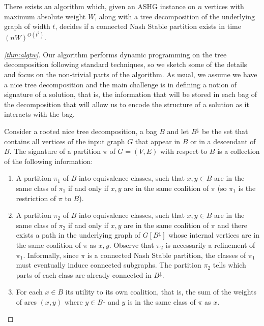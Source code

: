 \documentclass[letterpaper,USenglish,cleveref, autoref, thm-restate]{lipics-v2021}
\begin{document}
\begin{theorem}\label{thm:algtw}There exists an algorithm which, given an ASHG instance on $n$
vertices with maximum absolute weight $W$, along with a tree decomposition of
the underlying graph of width $t$, decides if a connected Nash Stable partition
exists in time $(nW)^{O(t^2)}$. \end{theorem}


\begin{proof}[\cref{thm:algtw}]

Our algorithm performs dynamic programming on the tree decomposition following
standard techniques, so we sketch some of the details and focus on the
non-trivial parts of the algorithm. As usual, we assume we have a nice tree
decomposition \cite{CyganFKLMPPS15} and the main challenge is in defining a
notion of signature of a solution, that is, the information that will be stored
in each bag of the decomposition that will allow us to encode the structure of
a solution as it interacts with the bag.

Consider a rooted nice tree decomposition, a bag $B$ and let $B^{\downarrow}$
be the set that contains all vertices of the input graph $G$ that appear in $B$
or in a descendant of $B$. The signature of a partition $\pi$ of $G=(V,E)$ with
respect to $B$ is a collection of the following information:

\begin{enumerate}

\item A partition $\pi_1$ of $B$ into equivalence classes, such that $x,y\in B$
are in the same class of $\pi_1$ if and only if $x,y$ are in the same coalition
of $\pi$ (so $\pi_1$ is the restriction of $\pi$ to $B$).

\item A partition $\pi_2$ of $B$ into equivalence classes, such that $x,y\in B$
are in the same class of $\pi_2$ if and only if $x,y$ are in the same coalition
of $\pi$ and there exists a path in the underlying graph of $G[B^{\downarrow}]$
whose internal vertices are in the same coalition of $\pi$ as $x,y$. Observe
that $\pi_2$ is necessarily a refinement of $\pi_1$. Informally, since $\pi$ is
a connected Nash Stable partition, the classes of $\pi_1$ must eventually
induce connected subgraphs. The partition $\pi_2$ tells which parts of each
class are already connected in $B^{\downarrow}$.

\item For each $x\in B$ its utility to its own coalition, that is, the sum of
the weights of arcs $(x,y)$ where $y\in B^{\downarrow}$ and $y$ is in the same
class of $\pi$ as $x$.


\end{enumerate}
\end{proof}
\end{document}
